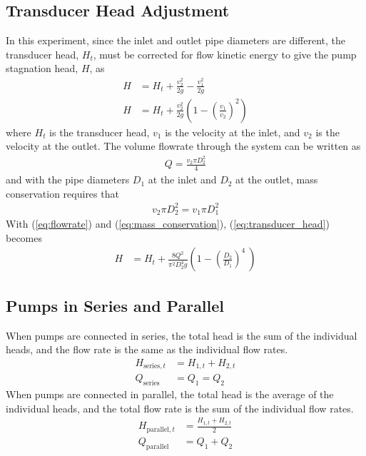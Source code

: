 \subsection{Transducer Head Adjustment}
In this experiment, since the inlet and outlet pipe diameters are different, the transducer head, $H_t$, must be corrected for flow kinetic energy to give the pump stagnation head, $H$, as
\begin{align}
    H &= H_t + \frac{v_2^2}{2g} - \frac{v_1^2}{2g} \nonumber \\
    H &= H_t + \frac{v_2^2}{2g} \left(1 - \left(\frac{v_1}{v_2}\right)^2\right) \label{eq:transducer_head}
\end{align}
where $H_t$ is the transducer head, $v_1$ is the velocity at the inlet, and $v_2$ is the velocity at the outlet. The volume flowrate through the system can be written as
\begin{align}
    Q = \frac{v_2 \pi D_2^2}{4} \label{eq:flowrate}
\end{align}
and with the pipe diameters $D_1$ at the inlet and $D_2$ at the outlet, mass conservation requires that
\begin{align}
    v_2 \pi D_2^2 = v_1 \pi D_1^2 \label{eq:mass_conservation}
\end{align}
With (\ref{eq:flowrate}) and (\ref{eq:mass_conservation}), (\ref{eq:transducer_head}) becomes
\begin{align}
    H &= H_t + \frac{8Q^2}{\pi^2 D_2^4 g} \left(1 - \left(\frac{D_2}{D_1}\right)^4\ \right) \label{eq:transducer_head2}
\end{align}

\subsection{Pumps in Series and Parallel}
When pumps are connected in series, the total head is the sum of the individual heads, and the flow rate is the same as the individual flow rates. 
\begin{align}
    H_{\text{series}, t} &= H_{1,t} + H_{2,t} \label{eq:series_head}  \\
    Q_{\text{series}} &= Q_1 = Q_2 \label{eq:series_flow}
\end{align} 
When pumps are connected in parallel, the total head is the average of the individual heads, and the total flow rate is the sum of the individual flow rates.
\begin{align}
    H_{\text{parallel}, t} &= \frac{H_{1,t} + H_{2,t}}{2} \label{eq:parallel_head} \\
    Q_{\text{parallel}} &= Q_1 + Q_2 \label{eq:parallel_flow}
\end{align}

